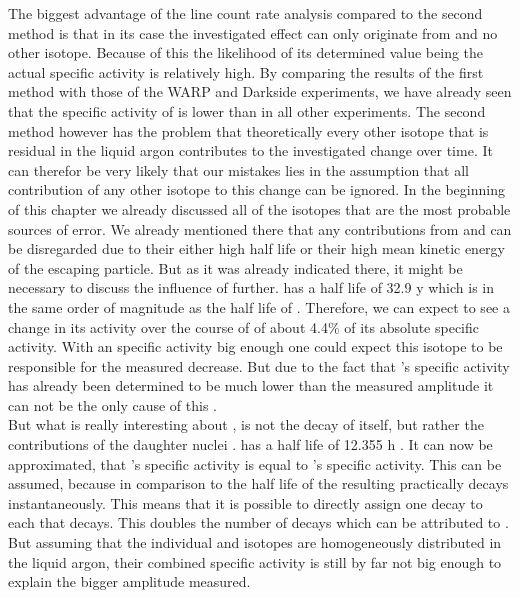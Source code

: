 The biggest advantage of the line count rate analysis compared to the second method is that in its case the investigated effect can only originate from \Kr and no other isotope.
Because of this the likelihood of its determined value being the actual specific activity is relatively high.
By comparing the results of the first method with those of the WARP and Darkside experiments, we have already seen that the specific activity of \Kr is lower than in all other experiments.
The second method however has the problem that theoretically every other isotope that is residual in the liquid argon contributes to the investigated change over time.
It can therefor be very likely that our mistakes lies in the assumption that all contribution of any other isotope to this change can be ignored. 
In the beginning of this chapter we already discussed all of the isotopes that are the most probable sources of error.
We already mentioned there that any contributions from  and  can be disregarded due to their either high half life or their high mean kinetic energy of the escaping particle.
But as it was already indicated there, it might be necessary to discuss the influence of  further.
 has a half life of 32.9 y which is in the same order of magnitude as the half life of \Kr.
Therefore, we can expect to see a change in its activity over the course of \PII of about 4.4$\%$ of its absolute specific activity.
With an specific activity big enough one could expect this isotope to be responsible for the measured decrease.
But due to the fact that 's specific activity has already been determined to be much lower than the measured amplitude it can not be the only cause of this .
\\

But what is really interesting about , is not the decay of  itself, but rather the contributions of the daughter nuclei .
 has a half life of 12.355 h \cite{chen_nuclear_2016}.
It can now be approximated, that 's specific activity is equal to 's specific activity.
This can be assumed, because in comparison to the half life of  the resulting  practically decays instantaneously.
This means that it is possible to directly assign one  decay to each  that decays.
This doubles the number of decays which can be attributed to .
But assuming that the individual  and  isotopes are homogeneously distributed in the liquid argon, their combined specific activity is still by far not big enough to explain the bigger amplitude measured.
\\

